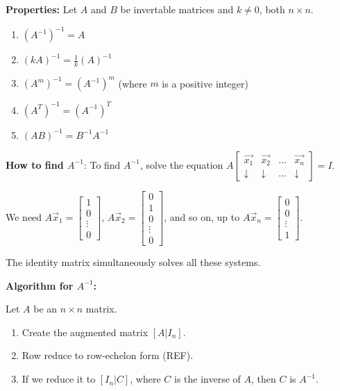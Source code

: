 \documentclass{article}
\begin{document}
\textbf{Properties:} Let \( A \) and \( B \) be invertable matrices and \( k \neq 0 \), both \( n \times n \).
\begin{enumerate}
    \item \( (A^{-1})^{-1} = A \)
    \item \( (kA)^{-1} = \frac{1}{k} (A)^{-1} \)
    \item \( (A^m)^{-1} = (A^{-1})^m \) (where \( m \) is a positive integer)
    \item \( (A^T)^{-1} = (A^{-1})^T \)
    \item \( (AB)^{-1} = B^{-1}A^{-1} \)
\end{enumerate}

\textbf{How to find \( A^{-1} \)}: To find \( A^{-1} \), solve the equation \( A\begin{bmatrix} \vec{x_1} & \vec{x_2} & \ldots & \vec{x_n} \\
\downarrow & \downarrow & \ldots & \downarrow \end{bmatrix} = I \).

We need \( A\vec{x}_1 = \begin{bmatrix} 1 \\ 0 \\ \vdots \\ 0 \end{bmatrix} \), \( A\vec{x}_2 = \begin{bmatrix} 0 \\ 1 \\ 0 \\ \vdots \\ 0 \end{bmatrix} \), and so on, up to \( A\vec{x}_n = \begin{bmatrix} 0 \\ 0 \\ \vdots \\ 1 \end{bmatrix} \). 

The identity matrix simultaneously solves all these systems.

\textbf{Algorithm for \( A^{-1} \):}

Let \( A \) be an \( n \times n \) matrix.

\begin{enumerate}
    \item Create the augmented matrix \( [A|I_n] \).
    \item Row reduce to row-echelon form (REF).
    \item If we reduce it to \( [I_n|C] \), where \( C \) is the inverse of \( A \), then \( C \) is \( A^{-1} \).
\end{enumerate}
\end{document}
